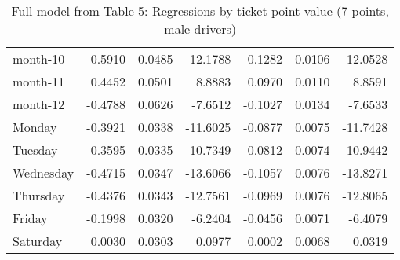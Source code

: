 \documentclass[10pt]{article}
\begin{document}
\begin{table}[ht]
\begin{tabular}{lrrrrrr}
  month-10 & 0.5910 & 0.0485 & 12.1788 & 0.1282 & 0.0106 & 12.0528 \\ 
  month-11 & 0.4452 & 0.0501 & 8.8883 & 0.0970 & 0.0110 & 8.8591 \\ 
  month-12 & -0.4788 & 0.0626 & -7.6512 & -0.1027 & 0.0134 & -7.6533 \\ 
  Monday & -0.3921 & 0.0338 & -11.6025 & -0.0877 & 0.0075 & -11.7428 \\ 
  Tuesday & -0.3595 & 0.0335 & -10.7349 & -0.0812 & 0.0074 & -10.9442 \\ 
  Wednesday & -0.4715 & 0.0347 & -13.6066 & -0.1057 & 0.0076 & -13.8271 \\ 
  Thursday & -0.4376 & 0.0343 & -12.7561 & -0.0969 & 0.0076 & -12.8065 \\ 
  Friday & -0.1998 & 0.0320 & -6.2404 & -0.0456 & 0.0071 & -6.4079 \\ 
  Saturday & 0.0030 & 0.0303 & 0.0977 & 0.0002 & 0.0068 & 0.0319 \\ 
   \hline
\end{tabular}
\caption{Full model from Table 5: Regressions by ticket-point value (7 points, male drivers)} 
\label{tab_5_7_pts_no_age_M}
\end{table}


\clearpage
\pagebreak



\end{document}

